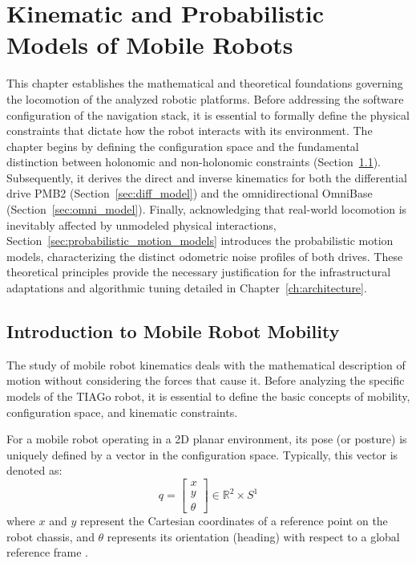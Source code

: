 
\chapter{Kinematic and Probabilistic Models of Mobile Robots}
\label{Ch:Kinematic}
This chapter establishes the mathematical and theoretical foundations governing the locomotion of the analyzed robotic platforms. Before addressing the software configuration of the navigation stack, it is essential to formally define the physical constraints that dictate how the robot interacts with its environment. The chapter begins by defining the configuration space and the fundamental distinction between holonomic and non-holonomic constraints (Section~\ref{sec:intro_kin}). Subsequently, it derives the direct and inverse kinematics for both the differential drive PMB2 (Section~\ref{sec:diff_model}) and the omnidirectional OmniBase (Section~\ref{sec:omni_model}). Finally, acknowledging that real-world locomotion is inevitably affected by unmodeled physical interactions, Section~\ref{sec:probabilistic_motion_models} introduces the probabilistic motion models, characterizing the distinct odometric noise profiles of both drives. These theoretical principles provide the necessary justification for the infrastructural adaptations and algorithmic tuning detailed in Chapter~\ref{ch:architecture}.

\section{Introduction to Mobile Robot Mobility}
\label{sec:intro_kin}

The study of mobile robot kinematics deals with the mathematical description of motion without considering the forces that cause it. Before analyzing the specific models of the TIAGo robot, it is essential to define the basic concepts of mobility, configuration space, and kinematic constraints.

For a mobile robot operating in a 2D planar environment, its pose (or posture) is uniquely defined by a vector in the configuration space. Typically, this vector is denoted as:
\begin{equation}
    q = \begin{bmatrix} x \\ y \\ \theta \end{bmatrix} \in \mathbb{R}^2 \times S^1
\end{equation}
where $x$ and $y$ represent the Cartesian coordinates of a reference point on the robot chassis, and $\theta$ represents its orientation (heading) with respect to a global reference frame \cite{palli_amr_slides}.

